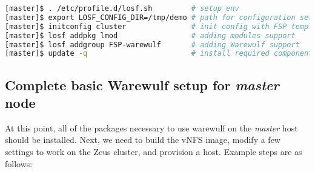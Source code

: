 \documentclass[letterpaper]{article}
\begin{document}
\vspace*{0.2cm}


\begin{lstlisting}[language=bash,keywords={}]
[master]$ . /etc/profile.d/losf.sh         # setup env
[master]$ export LOSF_CONFIG_DIR=/tmp/demo # path for configuration setup
[master]$ initconfig cluster               # init config with FSP template
[master]$ losf addpkg lmod                 # adding modules support
[master]$ losf addgroup FSP-warewulf       # adding Warewulf support
[master]$ update -q                        # install required components
\end{lstlisting}


\subsection{Complete basic Warewulf setup for {\em master} node}

At this point, all of the packages necessary to use warewulf on the {\em master}
host should be installed.  Next, we need to build the vNFS image, modify a few
settings to work on the Zeus cluster, and provision a host. Example steps are
as follows:

\vspace*{0.2cm}

\end{document}
